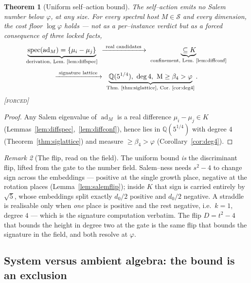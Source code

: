 \documentclass[11pt]{article}
\theoremstyle{plain}
\newtheorem{theorem}{Theorem}[section]
\theoremstyle{definition}
\theoremstyle{remark}
\newtheorem{remark}[theorem]{Remark}
\newcommand{\forced}{\textcolor{forcedc}{\textsc{[forced]}}}
\newcommand{\Q}{\mathbb{Q}}
\newcommand{\Mah}{\mathrm{M}}
\newcommand{\Scal}{\mathcal{S}}
\begin{document}
\begin{theorem}[Uniform self--action bound]\label{thm:uniform}
The self--action emits no Salem number below $\varphi$, at any size. For every spectral host $M\in\Scal$ and every dimension, the cost floor $\log\varphi$ holds --- not as a per--instance verdict but as a forced consequence of three locked facts,
\[
\begin{gathered}
\underbrace{\operatorname{spec}(\operatorname{ad}_M)=\{\mu_i-\mu_j\}}_{\text{derivation, Lem.~\ref{lem:diffspec}}}
\ \xrightarrow{\ \text{real candidates}\ }\
\underbrace{{}\subseteq K}_{\text{confinement, Lem.~\ref{lem:diffconf}}}\\[4pt]
\xrightarrow{\ \text{signature lattice}\ }\
\underbrace{\Q(5^{1/4}),\ \deg 4,\ \Mah\ge\beta_4>\varphi}_{\text{Thm.~\ref{thm:siglattice}, Cor.~\ref{cor:deg4}}}.
\end{gathered}
\]
\forced
\end{theorem}

\begin{proof}
Any Salem eigenvalue of $\operatorname{ad}_M$ is a real difference $\mu_i-\mu_j\in K$ (Lemmas~\ref{lem:diffspec},~\ref{lem:diffconf}), hence lies in $\Q(5^{1/4})$ with degree $4$ (Theorem~\ref{thm:siglattice}) and measure $\ge\beta_4>\varphi$ (Corollary~\ref{cor:deg4}). \end{proof}

\begin{remark}[The flip, read on the field]\label{rem:fieldflip}
The uniform bound \emph{is} the discriminant flip, lifted from the gate to the number field. Salem--ness needs $s^2-4$ to change sign across the embeddings --- positive at the single growth place, negative at the rotation places (Lemma~\ref{lem:salemflip}); inside $K$ that sign is carried entirely by $\sqrt5$, whose embeddings split exactly $d_0/2$ positive and $d_0/2$ negative. A straddle is realisable only when \emph{one} place is positive and the rest negative, i.e.\ $k=1$, degree $4$ --- which is the signature computation verbatim. The flip $D=t^2-4$ that bounds the height in degree two at the gate is the same flip that bounds the signature in the field, and both resolve at $\varphi$.
\end{remark}

\subsection{System versus ambient algebra: the bound is an exclusion}\label{sec:exclusion}
\end{document}
